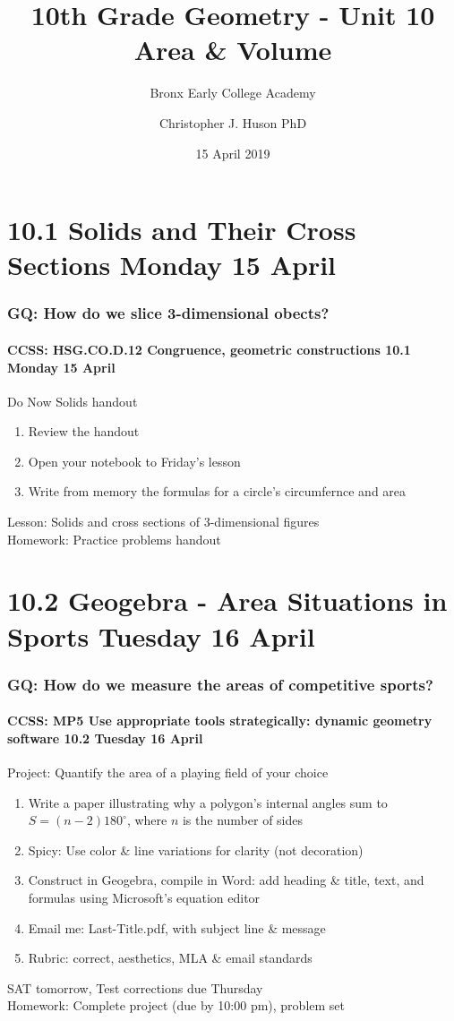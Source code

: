 \documentclass{beamer}
\title{10th Grade Geometry - Unit 10 Area \& Volume}
\subtitle{Bronx Early College Academy}
\author{Christopher J. Huson PhD}
\date{15 April 2019}
\begin{document}
\frame{\titlepage}
\section[Outline]{}
\frame{\tableofcontents}


\section{10.1 Solids and Their Cross Sections Monday 15 April}
  \frame
  {
    \frametitle{GQ: How do we slice 3-dimensional obects?}
    \framesubtitle{CCSS: HSG.CO.D.12 Congruence, geometric constructions \hfill \alert{10.1 Monday 15 April}}

    \begin{block}{Do Now Solids handout}
      \begin{enumerate}
        \item Review the handout
        \item Open your notebook to Friday's lesson
        \item Write from memory the formulas for a circle's circumfernce and area
      \end{enumerate}
    \end{block}
    Lesson: Solids and cross sections of 3-dimensional figures\\
    Homework: Practice problems handout
  }

\section{10.2 Geogebra - Area Situations in Sports Tuesday 16 April}
  \frame
  {
    \frametitle{GQ: How do we measure the areas of competitive sports?}
    \framesubtitle{CCSS: MP5 Use appropriate tools strategically: dynamic geometry software \hfill \alert{10.2 Tuesday 16 April}}

    \begin{block}{Project: Quantify the area of a playing field of your choice}
      \begin{enumerate}
        \item Write a paper illustrating why a polygon's internal angles sum to $S=(n-2)180^\circ$, where $n$ is the number of sides
        \item Spicy: Use color \& line variations for clarity (not decoration)
        \item Construct in Geogebra, compile in Word: add heading \& title, text, and formulas using Microsoft's equation editor
        \item Email me: Last-Title.pdf, with subject line \& message
        \item Rubric: correct, aesthetics, MLA \& email standards
      \end{enumerate}
    \end{block}
    SAT tomorrow, \alert{Test corrections due Thursday}\\
    Homework: Complete project (due by 10:00 pm), problem set
  }
\end{document}
